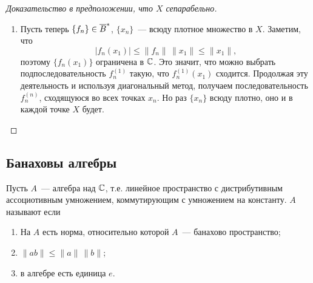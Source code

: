 \documentclass{notes}
\newcommand{\ssph}{\ov{B}^*}
\begin{document}
\begin{thm}
\begin{proof}[Доказательство в предположении, что $X$ сепарабельно]
\begin{enumerate}
				Поскольку множество $\{x_n\}$ плотное, для каждого $y_k$ найдётся $x_{i_k}$ такой, что
				\[
					\|y_k - x_{i_k}\| < \dfrac{\varepsilon}{3\big(1 + \|f_0\|\big)}.
				\]
				Положим $\delta = \tfrac{\varepsilon}{3}$ и рассмотрим $f \in U_{\delta} \cap \ssph$. Проверим, лежит ли $f$ в $V_{\varepsilon}$:
				\begin{align*}
					\big|f(y_k) - f_0(y_k)\big| &= \big|f(y_k) - f(x_{i_k}) + f(x_{i_k}) - f_0(x_{i_k}) + f_0(x_{i_k}) - f_0(y_k)\big| \leqslant \\ 
					&\leqslant \big|f(y_k) - f(x_{i_k})\big| + \big|f(x_{i_k}) - f_0(x_{i_k})\big| + \big|f_0(x_{i_k}) - f_0(y_k)\big| \leqslant \\
					&\leqslant \underbrace{\|f\| \, \|y_k - x_{i_k}\|}_{<\dfrac{\varepsilon}{3\big(1 + \|f_0\|\big)}} + \underbrace{\big|f(x_{i_k}) - f_0(x_{i_k})\big|}_{\leqslant\dfrac{\varepsilon}{3}} + \|f_0\| \, \underbrace{\|x_{i_k} - y_k\|}_{\mathclap{<\dfrac{\varepsilon}{3\big(1 + \|f_0\|\big)}}} < \varepsilon.
				\end{align*}
				Успех!
				\item Пусть теперь $\{f_n\} \in \ssph$, $\{x_n\}$~--- всюду плотное множество в $X$. Заметим, что
				\[
					\big|f_n(x_1)\big| \leqslant \|f_n\| \, \|x_1\| \leqslant \|x_1\|,
				\]
				поэтому $\big\{f_n(x_1)\big\}$ ограничена в $\mathbb{C}$. Это значит, что можно выбрать подпоследовательность $f_n^{(1)}$ такую, что $f_n^{(1)}(x_1)$ сходится. Продолжая эту деятельность и используя диагональный метод, получаем последовательность $f_n^{(n)}$, сходящуюся во всех точках $x_n$. Но раз $\{x_n\}$ всюду плотно, оно и в каждой точке $X$ будет.
			\end{enumerate}
		\end{proof}
	\end{thm}

\subsection{Банаховы алгебры}

	\begin{de}
		Пусть $A$~--- алгебра над $\mathbb{C}$, т.е. линейное пространство с дистрибутивным ассоциотивным умножением, коммутирующим с умножением на константу. $A$ называют  если 
		\begin{enumerate}
			\item На $A$ есть норма, относительно которой $A$~--- банахово пространство;
			\item $\|ab\| \leqslant \|a\|\,\|b\|$;
			\item в алгебре есть единица $e$.
		\end{enumerate}
	\end{de}
\end{document}
